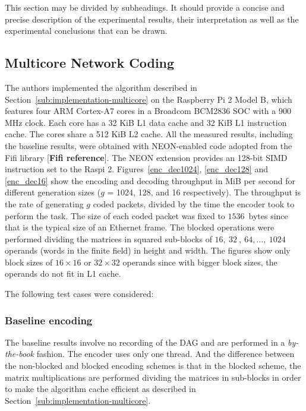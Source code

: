 \label{sec:measurements}

This section may be divided by subheadings. It should provide a concise and
precise description of the experimental results, their interpretation as well
as the experimental conclusions that can be drawn.

\subsection{Multicore Network Coding}
\label{subs:multicore-network-coding}

The authors implemented the algorithm described in
Section~\ref{sub:implementation-multicore} on the Raspberry Pi 2 Model B,
which features four ARM Cortex-A7 cores in a Broadcom BCM2836 \ac{SOC}
with a 900 MHz clock. Each core has a 32 KiB L1 data cache and 32 KiB
L1 instruction cache. The cores share a 512 KiB L2 cache. All the
measured results, including the baseline results, were obtained with
NEON-enabled code adopted from the Fifi library [\textbf{Fifi reference}].
The NEON extension provides an 128-bit \ac{SIMD} instruction set to the
\ac{Raspi} 2. Figures~\ref{enc_dec1024}, \ref{enc_dec128} and
\ref{enc_dec16} show the encoding and decoding throughput in MiB per
second for different generation sizes ($g$ = 1024, 128, and 16
respectively). The throughput is the rate of generating $g$ coded packets,
divided by the time the encoder took to perform the task. The size of
each coded packet was fixed to $1536$~bytes since that is the typical
size of an Ethernet frame. The blocked operations were performed dividing
the matrices in squared sub-blocks of $16,\ 32\ ,\ 64,\ldots,\ 1024$ operands
(words in the finite field) in height and width. The figures show only
block sizes of $16 \times 16$ or $32 \times 32$ operands since with bigger
block sizes, the operands do not fit in L1 cache.

The following test cases were considered:

\subsubsection{Baseline encoding}
The baseline results involve no recording of the
\ac{DAG} and are performed in a \emph{by-the-book} fashion. The encoder uses
only one thread. And the difference between the non-blocked and blocked
encoding schemes is that in the blocked scheme, the matrix multiplications are
performed dividing the matrices in sub-blocks in order to make the algorithm
cache efficient as described in Section~\ref{sub:implementation-multicore}.

